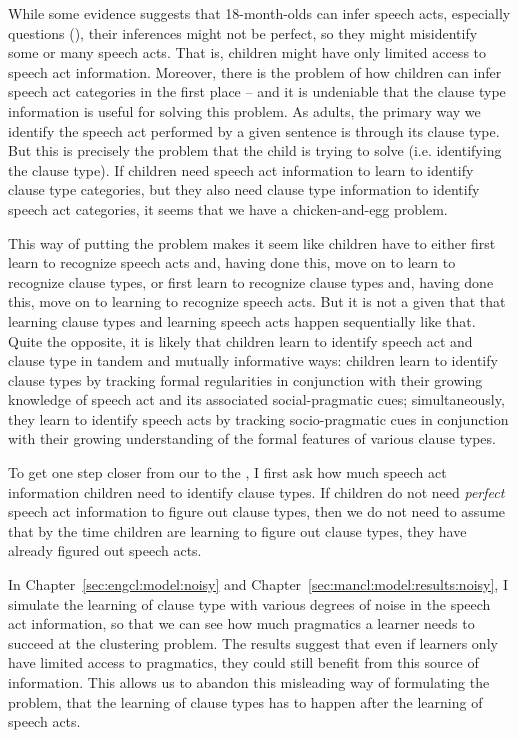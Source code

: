 While some evidence suggests that 18-month-olds can infer speech acts, especially questions (\cite{casillas2017turn, marshmallowqueen}), their inferences might not be perfect, so they might misidentify some or many speech acts. That is, children might have only limited access to speech act information. Moreover, there is the problem of how children can infer speech act categories in the first place -- and it is undeniable that the clause type information is useful for solving this problem. As adults, the primary way we identify the speech act performed by a given sentence is through its clause type. But this is precisely the problem that the child is trying to solve (i.e. identifying the clause type). If children need speech act information to learn to identify clause type categories, but they also need clause type information to identify speech act categories, it seems that we have a chicken-and-egg problem. 

This way of putting the problem makes it seem like children have to either first learn to recognize speech acts and, having done this, move on to learn to recognize clause types, or first learn to recognize clause types and, having done this, move on to learning to recognize speech acts. But it is not a given that 
that learning clause types and learning speech acts happen sequentially like that. Quite the opposite, it is likely that children learn to identify speech act and clause type in tandem and mutually informative ways: children learn to identify clause types by tracking formal regularities in conjunction with their growing
knowledge of speech act and its associated social-pragmatic cues; simultaneously, they learn
to identify speech acts by tracking socio-pragmatic cues in conjunction with their growing
understanding of the formal features of various clause types.


To get one step closer from our \subhypos{} to the \tbf{\hypos{}}, I first ask how much speech act information children need to identify clause types. If children do not need \emph{perfect} speech act information to figure out clause types, then we do not need to assume that by the time children are learning to figure out clause types, they have already figured out speech acts. %

In Chapter~\ref{sec:engcl:model:noisy} and Chapter~\ref{sec:mancl:model:results:noisy}, I simulate the learning of clause type with various degrees of noise in the speech act information, so that we can see how much pragmatics a learner needs to succeed at the clustering problem. The results suggest that even if learners only have limited access to pragmatics, they could still benefit from this source of information. This allows us to abandon this misleading way of formulating the problem, that the learning of clause types has to happen after the learning of speech acts.

